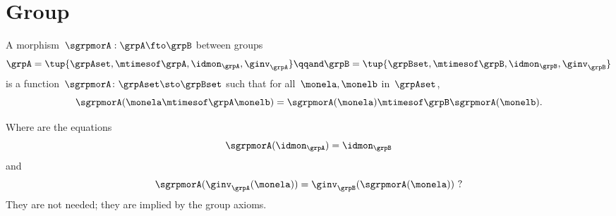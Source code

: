 \section{Group \whomos}


\begin{ctdefinition}
	\label{def:group-mor}
	A morphism~$\sgrpmorA: \grpA \fto \grpB$ between groups
	\begin{equation}
		\grpA = \tup{\grpAset, \mtimesof\grpA, \idmon_\grpA, \ginv_\grpA}
		\qqand
		\grpB = \tup{\grpBset, \mtimesof\grpB, \idmon_\grpB,  \ginv_\grpB}
	\end{equation}
	is a function~$\sgrpmorA \colon \grpAset \sto \grpBset$ such that for all~$\monela, \monelb$ in~$\grpAset$,
	\begin{equation}
		\label{eq:group-mor-comp}
		\sgrpmorA (\monela \mtimesof\grpA \monelb) = \sgrpmorA (\monela) \mtimesof\grpB  \sgrpmorA(\monelb).
	\end{equation}
\end{ctdefinition}

Where are the equations
\begin{equation}
	\label{eq:grp-id-comp}
	\sgrpmorA (\idmon_\grpA) = \idmon_{\grpB}
\end{equation}
and
\begin{equation}
	\label{eq:grp-inv-comp}
	\sgrpmorA (\ginv_\grpA(\monela)) = \ginv_\grpB(\sgrpmorA(\monela)) \ ?
\end{equation}
%
They are not needed; they are implied by the group axioms.

